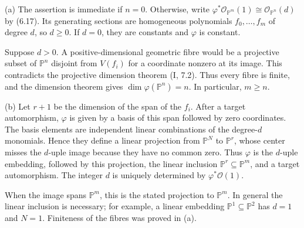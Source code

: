(a) The assertion is immediate if $n=0$. Otherwise, write $\varphi^*\mathcal O_{\mathbb P^m}(1)\cong\mathcal O_{\mathbb P^n}(d)$ by (6.17). Its generating sections are homogeneous polynomials $f_0,\ldots,f_m$ of degree $d$, so $d\ge0$. If $d=0$, they are constants and $\varphi$ is constant.

Suppose $d>0$. A positive-dimensional geometric fibre would be a projective subset of $\mathbb P^n$ disjoint from $V(f_i)$ for a coordinate nonzero at its image. This contradicts the projective dimension theorem (I, 7.2). Thus every fibre is finite, and the dimension theorem gives $\dim\varphi(\mathbb P^n)=n$. In particular, $m\ge n$.

(b) Let $r+1$ be the dimension of the span of the $f_i$. After a target automorphism, $\varphi$ is given by a basis of this span followed by zero coordinates. The basis elements are independent linear combinations of the degree-$d$ monomials. Hence they define a linear projection from $\mathbb P^N$ to $\mathbb P^r$, whose center misses the $d$-uple image because they have no common zero. Thus $\varphi$ is the $d$-uple embedding, followed by this projection, the linear inclusion $\mathbb P^r\subseteq\mathbb P^m$, and a target automorphism. The integer $d$ is uniquely determined by $\varphi^*\mathcal O(1)$.

When the image spans $\mathbb P^m$, this is the stated projection to $\mathbb P^m$. In general the linear inclusion is necessary; for example, a linear embedding $\mathbb P^1\subseteq\mathbb P^2$ has $d=1$ and $N=1$. Finiteness of the fibres was proved in (a).
